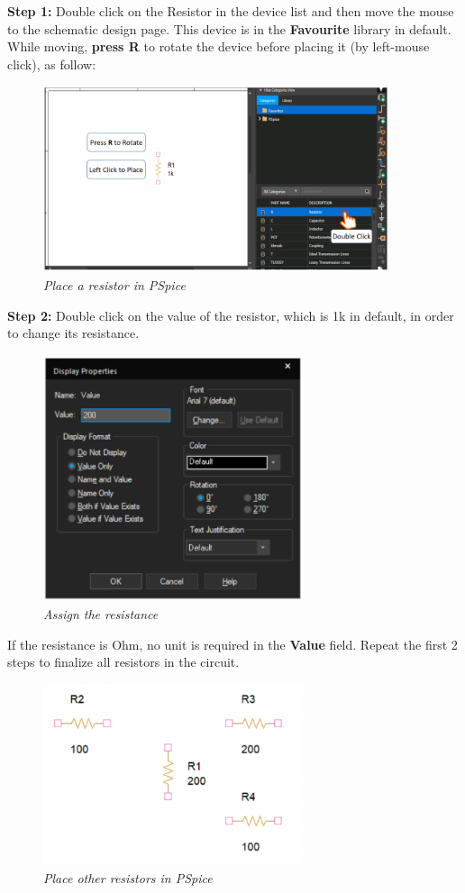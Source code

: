 \textbf{Step 1: } Double click on the Resistor in the device list and then move the mouse to the schematic design page. This device is in the \textbf{Favourite} library in default. While moving, \textbf{press R} to rotate the device before placing it (by left-mouse click), as follow:

\begin{figure}[!htp]
    \centering
    \includegraphics[width=4in]{source/picture/bai_1/pic6.PNG}
    \caption{\textit{Place a resistor in PSpice}}
    \label{bai1_pic6}
\end{figure}

\newpage
\textbf{Step 2: } Double click on the value of the resistor, which is 1k in default, in order to change its resistance.

\begin{figure}[!htp]
    \centering
    \includegraphics[width=3in]{source/picture/bai_1/pic7.PNG}
    \caption{\textit{Assign the resistance}}
    \label{bai1_pic7}
\end{figure}

If the resistance is Ohm, no unit is required in the \textbf{Value} field. Repeat the first 2 steps to finalize all resistors in the circuit.

\begin{figure}[!htp]
    \centering
    \includegraphics[width=3in]{source/picture/bai_1/pic8.PNG}
    \caption{\textit{Place other resistors in PSpice}}
    \label{bai1_pic8}
\end{figure}

